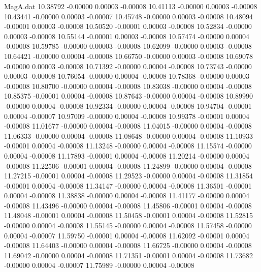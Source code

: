 \begin{filecontents}{MagA.dat}
  10.38792   -0.00000    0.00003   -0.00008
  10.41113   -0.00000    0.00003   -0.00008
  10.43441   -0.00000    0.00003   -0.00007
  10.45748   -0.00000    0.00003   -0.00008
  10.48094   -0.00001    0.00003   -0.00008
  10.50520   -0.00001    0.00003   -0.00008
  10.52834   -0.00000    0.00003   -0.00008
  10.55144   -0.00001    0.00003   -0.00008
  10.57474   -0.00000    0.00004   -0.00008
  10.59785   -0.00000    0.00003   -0.00008
  10.62099   -0.00000    0.00003   -0.00008
  10.64421   -0.00000    0.00004   -0.00008
  10.66750   -0.00000    0.00003   -0.00008
  10.69078   -0.00000    0.00003   -0.00008
  10.71392   -0.00000    0.00004   -0.00008
  10.73743   -0.00000    0.00003   -0.00008
  10.76054   -0.00000    0.00004   -0.00008
  10.78368   -0.00000    0.00003   -0.00008
  10.80700   -0.00000    0.00004   -0.00008
  10.83038   -0.00000    0.00004   -0.00008
  10.85375   -0.00001    0.00004   -0.00008
  10.87643   -0.00000    0.00004   -0.00008
  10.89990   -0.00000    0.00004   -0.00008
  10.92334   -0.00000    0.00004   -0.00008
  10.94704   -0.00001    0.00004   -0.00007
  10.97009   -0.00000    0.00004   -0.00008
  10.99378   -0.00001    0.00004   -0.00008
  11.01677   -0.00000    0.00004   -0.00008
  11.04015   -0.00000    0.00004   -0.00008
  11.06333   -0.00000    0.00004   -0.00008
  11.08648   -0.00000    0.00004   -0.00008
  11.10933   -0.00001    0.00004   -0.00008
  11.13248   -0.00000    0.00004   -0.00008
  11.15574   -0.00000    0.00004   -0.00008
  11.17893   -0.00001    0.00004   -0.00008
  11.20214   -0.00000    0.00004   -0.00008
  11.22506   -0.00001    0.00004   -0.00008
  11.24899   -0.00000    0.00004   -0.00008
  11.27215   -0.00001    0.00004   -0.00008
  11.29523   -0.00000    0.00004   -0.00008
  11.31854   -0.00001    0.00004   -0.00008
  11.34147   -0.00000    0.00004   -0.00008
  11.36501   -0.00001    0.00004   -0.00008
  11.38838   -0.00000    0.00004   -0.00008
  11.41177   -0.00000    0.00004   -0.00008
  11.43496   -0.00000    0.00004   -0.00008
  11.45806   -0.00001    0.00004   -0.00008
  11.48048   -0.00001    0.00004   -0.00008
  11.50458   -0.00001    0.00004   -0.00008
  11.52815   -0.00000    0.00004   -0.00008
  11.55145   -0.00000    0.00004   -0.00008
  11.57458   -0.00000    0.00004   -0.00007
  11.59750   -0.00001    0.00004   -0.00008
  11.62092   -0.00001    0.00004   -0.00008
  11.64403   -0.00000    0.00004   -0.00008
  11.66725   -0.00000    0.00004   -0.00008
  11.69042   -0.00000    0.00004   -0.00008
  11.71351   -0.00001    0.00004   -0.00008
  11.73682   -0.00000    0.00004   -0.00007
  11.75989   -0.00000    0.00004   -0.00008

\end{filecontents}
